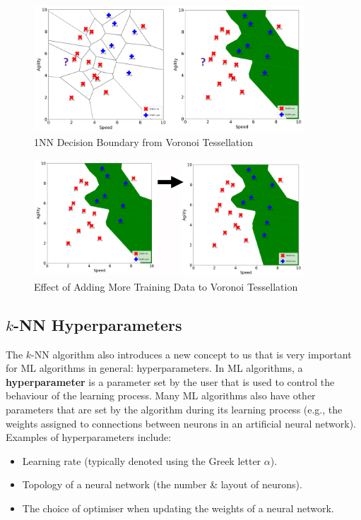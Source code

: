 \documentclass[a4paper,11pt]{article}
\begin{document}
\begin{figure}[H]
    \centering
    \includegraphics[width=0.9\textwidth]{images/1nnboundary.png}
    \caption{1NN Decision Boundary from Voronoi Tessellation}
\end{figure}

\begin{figure}[H]
    \centering
    \includegraphics[width=0.9\textwidth]{images/morevoronoi.png}
    \caption{Effect of Adding More Training Data to Voronoi Tessellation}
\end{figure}

\subsection{$k$-NN Hyperparameters}
The $k$-NN algorithm also introduces a new concept to us that is very important for ML algorithms in general: hyperparameters.
In ML algorithms, a \textbf{hyperparameter} is a parameter set by the user that is used to control the behaviour of the learning process.
Many ML algorithms also have other parameters that are set by the algorithm during its learning process (e.g., the weights
assigned to connections between neurons in an artificial neural network).
Examples of hyperparameters include:
\begin{itemize}
    \item   Learning rate (typically denoted using the Greek letter $\alpha$).
    \item   Topology of a neural network (the number \& layout of neurons).
    \item   The choice of optimiser when updating the weights of a neural network.
\end{itemize}
\end{document}
